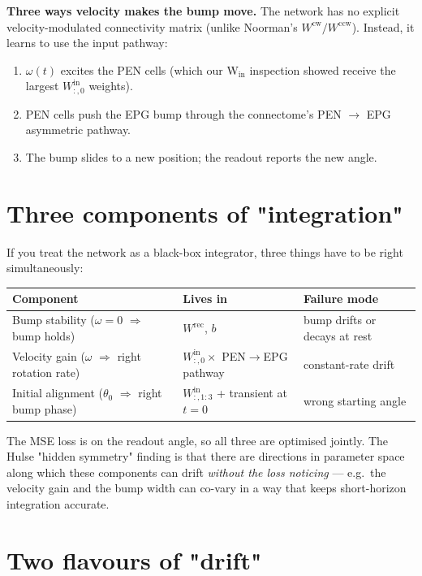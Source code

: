 \documentclass[11pt]{article}
\begin{document}
\textbf{Three ways velocity makes the bump move.} The network has no explicit
velocity-modulated connectivity matrix (unlike Noorman's $W^{\mathrm{cw}}/W^{\mathrm{ccw}}$).
Instead, it learns to use the input pathway:
\begin{enumerate}
\item $\omega(t)$ excites the PEN cells (which our W$_\mathrm{in}$ inspection
showed receive the largest $W^{\mathrm{in}}_{:,0}$ weights).
\item PEN cells push the EPG bump through the connectome's PEN $\to$ EPG
asymmetric pathway.
\item The bump slides to a new position; the readout reports the new angle.
\end{enumerate}

\section*{Three components of "integration"}

If you treat the network as a black-box integrator, three things have to be
right simultaneously:

\begin{center}\small
\begin{tabular}{lll}
\toprule
\textbf{Component} & \textbf{Lives in} & \textbf{Failure mode} \\
\midrule
Bump stability ($\omega=0$ $\Rightarrow$ bump holds) & $W^{\mathrm{rec}}$, $b$ & bump drifts or decays at rest \\
Velocity gain ($\omega$ $\Rightarrow$ right rotation rate) & $W^{\mathrm{in}}_{:,0}\times$ PEN$\to$EPG pathway & constant-rate drift \\
Initial alignment ($\theta_0$ $\Rightarrow$ right bump phase) & $W^{\mathrm{in}}_{:,1:3}$ + transient at $t{=}0$ & wrong starting angle \\
\bottomrule
\end{tabular}
\end{center}

The MSE loss is on the readout angle, so all three are optimised jointly.
The Hulse "hidden symmetry" finding is that there are directions in
parameter space along which these components can drift \emph{without the
loss noticing} --- e.g.\ the velocity gain and the bump width can co-vary
in a way that keeps short-horizon integration accurate.

\section*{Two flavours of "drift"}
\end{document}
